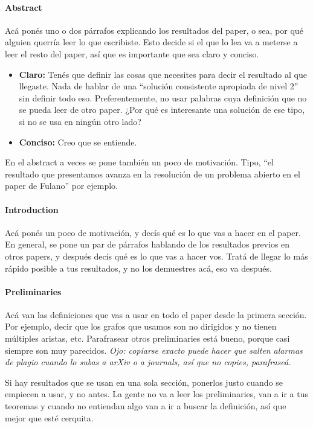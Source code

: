 \documentclass{article}
\begin{document}
\paragraph{Abstract} Acá ponés uno o dos párrafos explicando los resultados del paper, o sea, por qué alguien querría leer lo que escribiste. Esto decide si el que lo lea va a meterse a leer el resto del paper, así que es importante que sea claro y conciso. 
\begin{itemize}
\item \textbf{Claro:} Tenés que definir las cosas que necesites para decir el resultado al que llegaste. Nada de hablar de una ``solución consistente apropiada de nivel 2'' sin definir todo eso. Preferentemente, no usar palabras cuya definición que no se pueda leer de otro paper. ¿Por qué es interesante una solución de ese tipo, si no se usa en ningún otro lado?
\item \textbf{Conciso:} Creo que se entiende.
\end{itemize}

En el abstract a veces se pone también un poco de motivación. Tipo, ``el resultado que presentamos avanza en la resolución de un problema abierto en el paper de Fulano'' por ejemplo.

\paragraph{Introduction} Acá ponés un poco de motivación, y decís qué es lo que vas a hacer en el paper. En general, se pone un par de párrafos hablando de los resultados previos en otros papers, y después decís qué es lo que vas a hacer vos. Tratá de llegar lo más rápido posible a tus resultados, y no los demuestres acá, eso va después.

\paragraph{Preliminaries} Acá van las definiciones que vas a usar en todo el paper desde la primera sección. Por ejemplo, decir que los grafos que usamos son no dirigidos y no tienen múltiples aristas, etc. Parafrasear otros preliminaries está bueno, porque casi siempre son muy parecidos. \emph{Ojo: copiarse exacto puede hacer que salten alarmas de plagio cuando lo subas a arXiv o a journals, así que no copies, parafraseá.}

Si hay resultados que se usan en una sola sección, ponerlos justo cuando se empiecen a usar, y no antes. La gente no va a leer los preliminaries, van a ir a tus teoremas y cuando no entiendan algo van a ir a buscar la definición, así que mejor que esté cerquita. 
\end{document}
